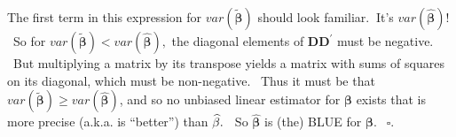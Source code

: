 \documentclass[11pt]{article}
\begin{document}
The first term in this expression for $var\left( \widetilde{\mathbf{\beta }}%
\right) $ should look familiar$.$ $\ $It's $var\left( \widehat{\mathbf{\beta 
}}\right) $! \ So for $var\left( \widetilde{\mathbf{\beta }}\right)
<var\left( \widehat{\mathbf{\beta }}\right) ,$ the diagonal elements of $%
\mathbf{DD}^{\prime }$ must be negative. \ But multiplying a matrix by its
transpose yields a matrix with sums of squares on its diagonal, which must
be non-negative. \ Thus it must be that $var\left( \widetilde{\mathbf{\beta }%
}\right) \geq var\left( \widehat{\mathbf{\beta }}\right) $, and so no
unbiased linear estimator for $\mathbf{\beta }$ exists that is more precise
(a.k.a. is \textquotedblleft better\textquotedblright ) than $\widehat{%
\mathbf{\beta }}.$ \ So $\widehat{\mathbf{\beta }}$ is (the) BLUE for $%
\mathbf{\beta .}$ $\ \ \mathbf{\square .}$  
\end{document}
